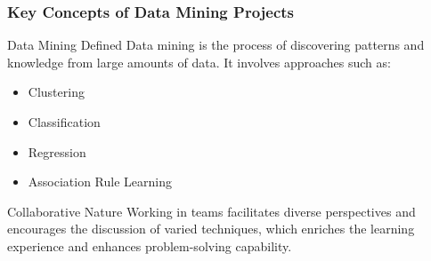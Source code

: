 \documentclass[aspectratio=169]{beamer}
\begin{document}
\begin{frame}[fragile]
    \frametitle{Key Concepts of Data Mining Projects}
    \begin{block}{Data Mining Defined}
        Data mining is the process of discovering patterns and knowledge from large amounts of data. It involves approaches such as:
        \begin{itemize}
            \item Clustering
            \item Classification
            \item Regression
            \item Association Rule Learning
        \end{itemize}
    \end{block}
    
    \begin{block}{Collaborative Nature}
        Working in teams facilitates diverse perspectives and encourages the discussion of varied techniques, which enriches the learning experience and enhances problem-solving capability.
    \end{block}
\end{frame}
\end{document}
